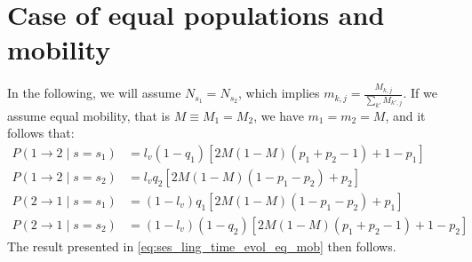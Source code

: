 \documentclass[../thesis.tex]{subfiles}
\begin{document}


\section{Case of equal populations and mobility}
In the following, we will assume $N_{s_1} = N_{s_2}$, which implies $m_{k, j} =
\frac{M_{k, j}}{\sum_{k'} M_{k', j}}$. If we assume equal mobility, that is $M \equiv
M_1 = M_2$, we have $m_1 = m_2 = M$, and it follows that:
\begin{equation}
    \begin{aligned}
        P(1 \rightarrow 2 \mid s = s_1)
            &= l_v (1 - q_1)
            \left[
                2 M (1 - M) (p_1 + p_2 - 1) + 1 - p_1
            \right]
        \\
        P(1 \rightarrow 2 \mid s = s_2)
            &= l_v q_2
            \left[
                2 M (1 - M) (1 - p_1 - p_2) + p_2
            \right]
        \\
        P(2 \rightarrow 1 \mid s = s_1)
            &= (1 - l_v) q_1
            \left[
                2 M (1 - M) (1 - p_1 - p_2) + p_1
            \right]
        \\
        P(2 \rightarrow 1 \mid s = s_2)
            &= (1 - l_v) (1 - q_2)
            \left[
                2 M (1 - M) (p_1 + p_2 - 1) + 1 - p_2
            \right]
    \end{aligned}
\end{equation}
The result presented in \cref{eq:ses_ling_time_evol_eq_mob} then follows.
\end{document}
